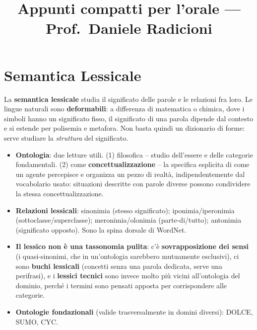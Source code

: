\documentclass[11pt,a4paper]{article}
\title{\vspace{-1.5cm}{\Large\bfseries Tecnologie del Linguaggio Naturale}\\[0.2cm]
  {\large Appunti compatti per l'orale --- Prof.\ Daniele Radicioni}}
\author{}
\date{}
\begin{document}
\maketitle
\vspace{-0.8cm}

\section{Semantica Lessicale}

La \textbf{semantica lessicale} studia il significato delle parole e le relazioni fra loro. Le lingue naturali sono \textbf{deformabili}: a differenza di matematica o chimica, dove i simboli hanno un significato fisso, il significato di una parola dipende dal contesto e si estende per polisemia e metafora. Non basta quindi un dizionario di forme: serve studiare la \emph{struttura} del significato.

\begin{itemize}
  \item \textbf{Ontologia}: due letture utili. (1) filosofica -- studio dell'essere e delle categorie fondamentali. (2) come \textbf{concettualizzazione} -- la specifica esplicita di come un agente percepisce e organizza un pezzo di realt\`a, indipendentemente dal vocabolario usato: situazioni descritte con parole diverse possono condividere la stessa concettualizzazione.
  \item \textbf{Relazioni lessicali}: sinonimia (stesso significato); iponimia/iperonimia (sottoclasse/superclasse); meronimia/olonimia (parte-di/tutto); antonimia (significato opposto). Sono la spina dorsale di WordNet.
  \item \textbf{Il lessico non \`e una tassonomia pulita}: c'\`e \textbf{sovrapposizione dei sensi} (i quasi-sinonimi, che in un'ontologia sarebbero mutuamente esclusivi), ci sono \textbf{buchi lessicali} (concetti senza una parola dedicata, serve una perifrasi), e i \textbf{lessici tecnici} sono invece molto pi\`u vicini all'ontologia del dominio, perch\'e i termini sono pensati apposta per corrispondere alle categorie.
  \item \textbf{Ontologie fondazionali} (valide trasversalmente in domini diversi): DOLCE, SUMO, CYC.
\end{itemize}
\end{document}
